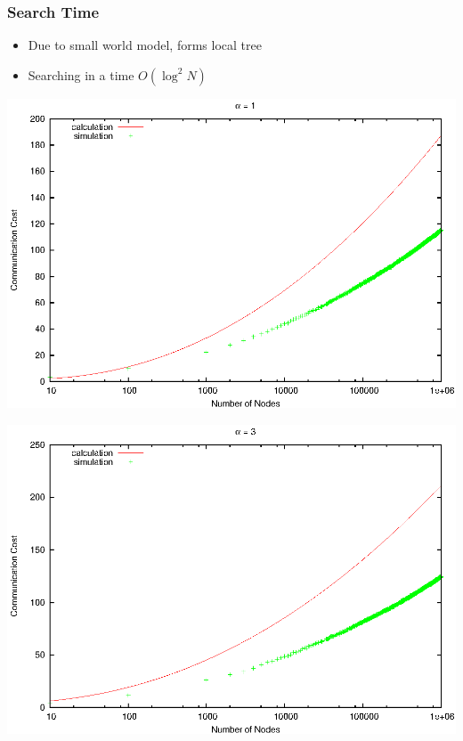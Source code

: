 \documentclass[red]{beamer}
\begin{document}
\begin{frame}
\frametitle{Search Time}
\begin{itemize}
\item Due to small world model, forms local tree 
\item Searching in a time $O(\log^2 N)$
\end{itemize}
\begin{minipage}{5cm}
\centering
\includegraphics[scale=0.4]{figs/time1}
\end{minipage}
\begin{minipage}{5cm}
\centering
\includegraphics[scale=0.4]{figs/time3}
\end{minipage}
\end{frame}

\end{document}
